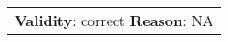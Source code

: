 \begin{figure*}[ht]
{\begin{tabular}{p{}}
            \textbf{Validity}: correct \textbf{Reason}: NA                                                                                                                                                                                                                                                                                                                                                                                                                                                                                                                                                                                                                                                                                                                                                                                                                                                                                                                                                                                                                                                                                                                                                                                                                                                                                                                                                                                                                                                                                                                                                                                                                                                                                                             \\

\end{tabular}}
\end{figure*}
